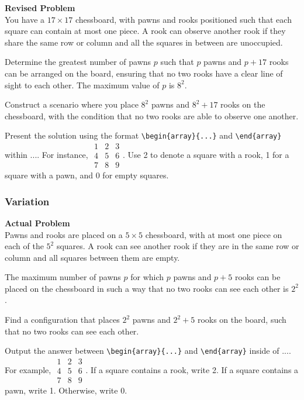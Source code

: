 \textbf{Revised Problem}\\
You have a $17 \times 17$ chessboard, with pawns and rooks positioned such that each square can contain at most one piece. A rook can observe another rook if they share the same row or column and all the squares in between are unoccupied.

Determine the greatest number of pawns $p$ such that $p$ pawns and $p + 17$ rooks can be arranged on the board, ensuring that no two rooks have a clear line of sight to each other. The maximum value of $p$ is $8^2$.

Construct a scenario where you place $8^2$ pawns and $8^2 + 17$ rooks on the chessboard, with the condition that no two rooks are able to observe one another.

Present the solution using the format \verb|\begin{array}{...}| and \verb|\end{array}| within $\boxed{...}$. For instance, $\boxed{\begin{array}{ccc}1 & 2 & 3 \\ 4 & 5 & 6 \\ 7 & 8 & 9\end{array}}$. Use 2 to denote a square with a rook, 1 for a square with a pawn, and 0 for empty squares.

\subsubsection{Variation}
\textbf{Actual Problem}\\
Pawns and rooks are placed on a $5 \times 5$ chessboard, with at most one piece on each of the $5^2$ squares. A rook can see another rook if they are in the same row or column and all squares between them are empty. 

The maximum number of pawns $p$ for which $p$ pawns and $p + 5$ rooks can be placed on the chessboard in such a way that no two rooks can see each other is $2^2$. 

Find a configuration that places $2^2$ pawns and $2^2 + 5$ rooks on the board, such that no two rooks can see each other.

Output the answer between \verb|\begin{array}{...}| and \verb|\end{array}| inside of $\boxed{...}$. For example, $\boxed{\begin{array}{ccc}1 & 2 & 3 \\ 4 & 5 & 6 \\ 7 & 8 & 9\end{array}}$.
If a square contains a rook, write 2. If a square contains a pawn, write 1. Otherwise, write 0.

